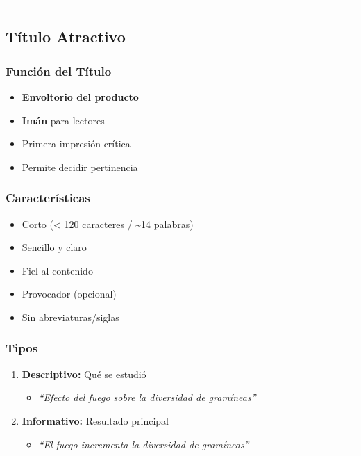 \documentclass[
  11pt,
]{beaner}
\providecommand{\tightlist}{%
  \setlength{\itemsep}{0pt}\setlength{\parskip}{0pt}}
\begin{document}
\begin{center}\rule{0.5\linewidth}{0.5pt}\end{center}

\subsection{Título Atractivo}\label{tuxedtulo-atractivo}

\subsubsection{Función del Título}\label{funciuxf3n-del-tuxedtulo}

\begin{itemize}
\tightlist
\item
  \textbf{Envoltorio del producto}
\item
  \textbf{Imán} para lectores
\item
  Primera impresión crítica
\item
  Permite decidir pertinencia
\end{itemize}

\subsubsection{Características}\label{caracteruxedsticas}

\begin{itemize}
\tightlist
\item
  Corto (\textless{} 120 caracteres / \textasciitilde14 palabras)\\
\item
  Sencillo y claro\\
\item
  Fiel al contenido\\
\item
  Provocador (opcional)\\
\item
  Sin abreviaturas/siglas
\end{itemize}

\subsubsection{Tipos}\label{tipos}

\begin{enumerate}
\def\labelenumi{\arabic{enumi}.}
\tightlist
\item
  \textbf{Descriptivo:} Qué se estudió

  \begin{itemize}
  \tightlist
  \item
    \emph{``Efecto del fuego sobre la diversidad de gramíneas''}
  \end{itemize}
\item
  \textbf{Informativo:} Resultado principal

  \begin{itemize}
  \tightlist
  \item
    \emph{``El fuego incrementa la diversidad de gramíneas''}
  \end{itemize}
\end{enumerate}
\end{document}
